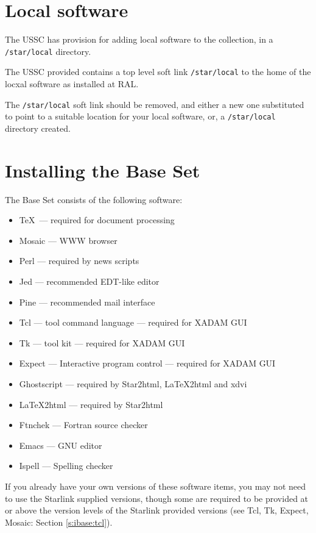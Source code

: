 \section{Local software}
\label{s:ilocal}

The USSC has provision for adding local software to the collection, in a 
{\tt /star/local} directory.  

The USSC provided contains a top level soft link {\tt /star/local} 
to the home of the locxal software as installed at RAL.

The {\tt /star/local} soft link should be removed, and either a new
one substituted to point to a suitable location for your local
software, or, a {\tt /star/local} directory created.

\section{Installing the Base Set}
\label{s:ibase}

The Base Set consists of the following software:

\begin{itemize}
\item \TeX\   --- required for document processing
\item Mosaic  --- WWW browser
\item Perl  --- required by news scripts
\item Jed  --- recommended EDT-like editor
\item Pine --- recommended mail interface
\item Tcl --- tool command language --- required for XADAM GUI
\item Tk --- tool kit --- required for XADAM GUI
\item Expect --- Interactive program control --- required for XADAM GUI
\item Ghostscript --- required by Star2html, LaTeX2html and xdvi
\item LaTeX2html --- required by Star2html
\item Ftnchek --- Fortran source checker
\item Emacs --- GNU editor
\item Ispell --- Spelling checker
\end{itemize}

If you already have your own versions of these software items, you may not
need to use the Starlink supplied versions, though some are required to be
provided at or above the version levels of the Starlink provided versions
(see Tcl, Tk, Expect, Mosaic: Section \ref{s:ibase:tcl}).

